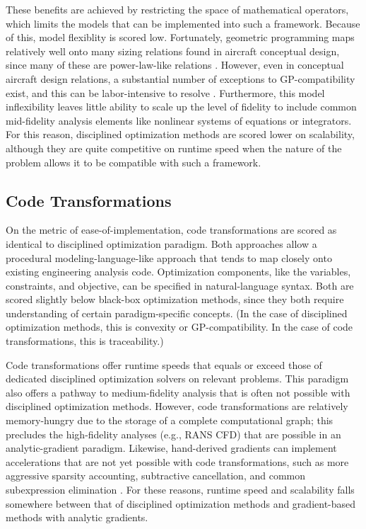 \documentclass[12pt,vi,oneside]{report}
\begin{document}
\begin{appendices}
        These benefits are achieved by restricting the space of mathematical operators, which limits the models that can be implemented into such a framework. Because of this, model flexiblity is scored low. Fortunately, geometric programming maps relatively well onto many sizing relations found in aircraft conceptual design, since many of these are power-law-like relations \cite{hoburg_geometric_2014}. However, even in conceptual aircraft design relations, a substantial number of exceptions to GP-compatibility exist, and this can be labor-intensive to resolve \cite{tao_phd_thesis}. Furthermore, this model inflexibility leaves little ability to scale up the level of fidelity to include common mid-fidelity analysis elements like nonlinear systems of equations or integrators. For this reason, disciplined optimization methods are scored lower on scalability, although they are quite competitive on runtime speed when the nature of the problem allows it to be compatible with such a framework.

        \subsection*{Code Transformations}

        On the metric of ease-of-implementation, code transformations are scored as identical to disciplined optimization paradigm. Both approaches allow a procedural modeling-language-like approach that tends to map closely onto existing engineering analysis code. Optimization components, like the variables, constraints, and objective, can be specified in natural-language syntax. Both are scored slightly below black-box optimization methods, since they both require understanding of certain paradigm-specific concepts. (In the case of disciplined optimization methods, this is convexity or GP-compatibility. In the case of code transformations, this is traceability.)

        Code transformations offer runtime speeds that equals or exceed those of dedicated disciplined optimization solvers on relevant problems. This paradigm also offers a pathway to medium-fidelity analysis that is often not possible with disciplined optimization methods. However, code transformations are relatively memory-hungry due to the storage of a complete computational graph; this precludes the high-fidelity analyses (e.g., RANS CFD) that are possible in an analytic-gradient paradigm. Likewise, hand-derived gradients can implement accelerations that are not yet possible with code transformations, such as more aggressive sparsity accounting, subtractive cancellation, and common subexpression elimination \cite{casadi, martins_complexstep_2003, martins_engineering_2021}. For these reasons, runtime speed and scalability falls somewhere between that of disciplined optimization methods and gradient-based methods with analytic gradients.


\end{appendices}
\end{document}
